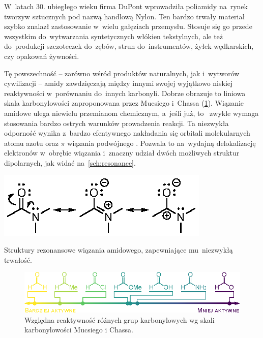 W~latach 30. ubiegłego wieku firma DuPont wprowadziła poliamidy na~rynek tworzyw sztucznych pod nazwą handlową Nylon.
Ten bardzo trwały materiał szybko znalazł zastosowanie w~wielu gałęziach przemysłu.
Stosuje się go przede wszystkim do~wytwarzania syntetycznych włókien tekstylnych,
ale też do~produkcji szczoteczek do~zębów, strun do~instrumentów, żyłek wędkarskich, czy opakowań żywności.

Tę powszechność \--- zarówno wśród produktów naturalnych, jak i~wytworów cywilizacji \---
amidy zawdzięczają między innymi swojej wyjątkowo niskiej reaktywności w~porównaniu do~innych karbonyli.
Dobrze obrazuje to liniowa skala karbonylowości zaproponowana przez Mucsiego i~Chassa (\cref{fig:carbonyl-scale})\autocite{mucsi08}.
Wiązanie amidowe ulega niewielu przemianom chemicznym, a~jeśli już, to~
zwykle wymaga stosowania bardzo ostrych warunków prowadzenia reakcji.
Ta niezwykła odporność wynika z~bardzo efentywnego nakładania się orbitali 
molekularnych atomu azotu oraz $\pi$ wiązania podwójnego .
Pozwala to na~wydajną delokalizację elektronów w~obrębie wiązania i~znaczny 
udział dwóch możliwych struktur dipolarnych, jak widać na~\cref{sch:resonance}.
\begin{marginscheme}
  \includegraphics{schemes/resonance}
  \caption{
    Struktury rezonansowe wiązania amidowego, zapewniające mu~niezwykłą trwałość.
  }
  \label{sch:resonance}
\end{marginscheme}

\begin{figure}
  \centering
  \includegraphics{graphics/carbonyl-scale-acc}
  \caption{
    Względna reaktywność róźnych grup karbonylowych
    wg skali karbonylowości Mucsiego i Chassa.
  }
  \label{fig:carbonyl-scale}
\end{figure}


